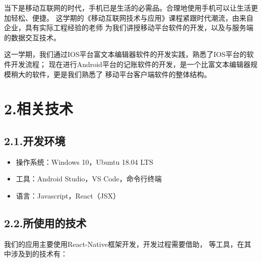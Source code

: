 \documentclass{article}
\begin{document}
\noindent{}当下是移动互联网的时代，手机已是生活的必需品。合理地使用手机可以让生活更加轻松、便捷。
这学期的《移动互联网技术与应用》课程紧跟时代潮流，由来自企业，具有实际工程经验的老师
为我们讲授移动平台软件的开发，以及与服务端的数据交互技术。%

这一学期，我们通过IOS平台富文本编辑器软件的开发实践，熟悉了IOS平台的软件开发流程；
现在进行Android平台的记账软件的开发，是一个比富文本编辑器规模稍大的软件，更是我们熟悉了
移动平台客户端软件的整体结构。%

\section{2.\hspace*{0.5em}相关技术}\label{section}%

\subsection{2.1.\hspace*{0.5em}开发环境}\label{section}%

\begin{itemize}[noitemsep,topsep=\mdcompacttopsep]%

\item{}操作系统：Windows 10，Ubuntu 18.04 LTS%

\item{}工具：Android Studio，VS Code，命令行终端%

\item{}语言：Javascript，React（JSX）%
\end{itemize}%

\subsection{2.2.\hspace*{0.5em}所使用的技术}\label{section}%

\noindent{}我们的应用主要使用React-Native框架开发，开发过程需要借助，
等工具，在其中涉及到的技术有：%
\end{document}
